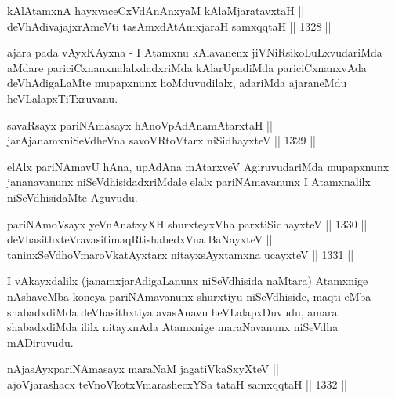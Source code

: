 
\begin{shl}
kAlAtamxnA hayxvaceCxVdAnAnxyaM kAlaMjaratavxtaH || \\
deVhAdivajajxrAmeVti tasAmxdAtAmx\s jaraH samxqqtaH \hfill || 1328 ||  
\end{shl}

\begin{artha}
ajara pada vAyxKAyxna - I Atamxnu kAlavanenx jiVNiRsikoLuLxvudariMda aMdare pariciCxnanxnalalxdadxriMda kAlarUpadiMda pariciCxnanxvAda deVhAdigaLaMte mupapxnunx hoMduvudilalx, adariMda ajaraneMdu heVLalapxTiTxruvanu.
\end{artha}

\begin{shl}
savaRsayx pariNAmasayx hAnoVpAdAnamAtarxtaH || \\
jarAjanamxniSeVdheVna savoVR\s toV\s tarx niSidhayxteV \hfill || 1329 ||  
\end{shl}

\begin{artha}
elAlx pariNAmavU hAna, upAdAna mAtarxveV AgiruvudariMda mupapxnunx jananavanunx niSeVdhisidadxriMdale elalx pariNAmavanunx I Atamxnalilx niSeVdhisidaMte Aguvudu.
\end{artha}


\begin{shl}
pariNAmoV\s sayx yeVnAnatxyXH shurxteyxVha parxtiSidhayxteV \hfill || 1330 ||  \\
deVhasithxteVravasitimaqRtishabedxVna BaNayxteV ||  \\
taninxSeVdhoV\s maroVkatAyx\s tarx nitayxsAyx\s \s tamxna ucayxteV \hfill || 1331 ||  
\end{shl}

\begin{artha}
I vAkayxdalilx (janamxjarAdigaLanunx niSeVdhisida naMtara) Atamxnige nAshaveMba koneya pariNAmavanunx shurxtiyu niSeVdhiside, maqti eMba shabadxdiMda deVhasithxtiya avasAnavu heVLalapxDuvudu, amara shabadxdiMda ililx nitayxnAda Atamxnige maraNavanunx niSeVdha mADiruvudu.
\end{artha}

\begin{shl}
nAjasAyxpariNAmasayx maraNaM jagatiVkaSxyXteV || \\
ajoV\s jarashacx teVnoVkotxV\s marashecxYSa tataH samxqqtaH \hfill || 1332 ||  
\end{shl}

